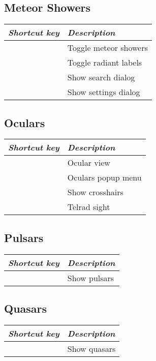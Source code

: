 \subsection{Meteor Showers}
\label{ch:Hotkeys:Plugins:MeteorShowers}
\begin{longtabu}to \textwidth {rl} 
\toprule
\emph{Shortcut key}		& \emph{Description}\\\midrule
{}		& Toggle meteor showers \\
			& Toggle radiant labels \\
		& Show search dialog \\
	& Show settings dialog \\
\bottomrule
\end{longtabu}

\subsection{Oculars}
\label{ch:Hotkeys:Plugins:Oculars}
\begin{longtabu}to \textwidth {rl} 
\toprule
\emph{Shortcut key}	& \emph{Description}\\\midrule
{}		& Ocular view \\
			& Oculars popup menu \\
			& Show crosshairs \\
		& Telrad sight \\
\bottomrule
\end{longtabu}

\subsection{Pulsars}
\label{ch:Hotkeys:Plugins:Pulsars}
\begin{longtabu}to \textwidth {rl} 
\toprule
\emph{Shortcut key}	& \emph{Description}\\\midrule
{}	& Show pulsars \\
\bottomrule
\end{longtabu}

\newpage
\subsection{Quasars}
\label{ch:Hotkeys:Plugins:Quasars}
\begin{longtabu}to \textwidth {rl} 
\toprule
\emph{Shortcut key}	& \emph{Description}\\\midrule
{}	& Show quasars \\
\bottomrule
\end{longtabu}

